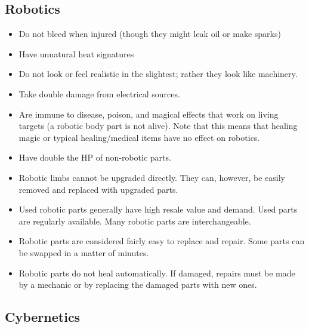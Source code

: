 \documentclass[twoside]{book}
\begin{document}
    

\subsection{Robotics}
    
\begin{itemize}
      
  \item   Do not bleed when injured (though they might leak
                 oil or make sparks) 
  \item   Have unnatural heat signatures 
  \item   Do not look or feel realistic in the slightest;
                 rather they look like machinery. 
  \item   Take double damage from electrical sources.
                 
  \item   Are immune to disease, poison, and magical
                 effects that work on living targets (a robotic body part
                 is not alive). Note that this means that healing magic
                 or typical healing/medical items have no effect on
                 robotics. 
  \item   Have double the HP of non-robotic parts. 
  \item   Robotic limbs cannot be upgraded directly. They
                 can, however, be easily removed and replaced with
                 upgraded parts. 
  \item   Used robotic parts generally have high resale
                 value and demand. Used parts are regularly available.
                 Many robotic parts are interchangeable. 
  \item   Robotic parts are considered fairly easy to
                 replace and repair. Some parts can be swapped in a
                 matter of minutes. 
  \item   Robotic parts do not heal automatically. If
                 damaged, repairs must be made by a mechanic or by
                 replacing the damaged parts with new ones. 
\end{itemize}
  
    

\subsection{Cybernetics}
    
\end{document}
